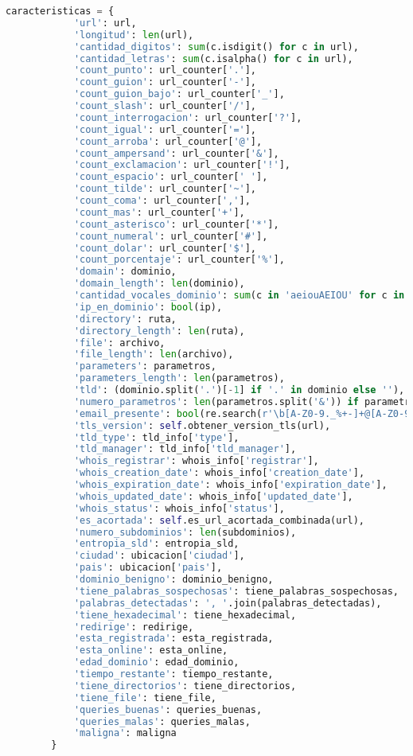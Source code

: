 \documentclass{article}
\begin{document}
\begin{lstlisting}[language=Python, caption=Clase para extraer características de URLs]
        caracteristicas = {
            'url': url,
            'longitud': len(url),
            'cantidad_digitos': sum(c.isdigit() for c in url),
            'cantidad_letras': sum(c.isalpha() for c in url),
            'count_punto': url_counter['.'],
            'count_guion': url_counter['-'],
            'count_guion_bajo': url_counter['_'],
            'count_slash': url_counter['/'],
            'count_interrogacion': url_counter['?'],
            'count_igual': url_counter['='],
            'count_arroba': url_counter['@'],
            'count_ampersand': url_counter['&'],
            'count_exclamacion': url_counter['!'],
            'count_espacio': url_counter[' '],
            'count_tilde': url_counter['~'],
            'count_coma': url_counter[','],
            'count_mas': url_counter['+'],
            'count_asterisco': url_counter['*'],
            'count_numeral': url_counter['#'],
            'count_dolar': url_counter['$'],
            'count_porcentaje': url_counter['%'],
            'domain': dominio,
            'domain_length': len(dominio),
            'cantidad_vocales_dominio': sum(c in 'aeiouAEIOU' for c in dominio),
            'ip_en_dominio': bool(ip),
            'directory': ruta,
            'directory_length': len(ruta),
            'file': archivo,
            'file_length': len(archivo),
            'parameters': parametros,
            'parameters_length': len(parametros),
            'tld': (dominio.split('.')[-1] if '.' in dominio else ''),
            'numero_parametros': len(parametros.split('&')) if parametros else 0,
            'email_presente': bool(re.search(r'\b[A-Z0-9._%+-]+@[A-Z0-9.-]+\.[A-Z]{2,}\b', url, re.I)),
            'tls_version': self.obtener_version_tls(url),
            'tld_type': tld_info['type'],
            'tld_manager': tld_info['tld_manager'],
            'whois_registrar': whois_info['registrar'],
            'whois_creation_date': whois_info['creation_date'],
            'whois_expiration_date': whois_info['expiration_date'],
            'whois_updated_date': whois_info['updated_date'],
            'whois_status': whois_info['status'],
            'es_acortada': self.es_url_acortada_combinada(url),
            'numero_subdominios': len(subdominios),
            'entropia_sld': entropia_sld,
            'ciudad': ubicacion['ciudad'],
            'pais': ubicacion['pais'],
            'dominio_benigno': dominio_benigno,
            'tiene_palabras_sospechosas': tiene_palabras_sospechosas,
            'palabras_detectadas': ', '.join(palabras_detectadas),
            'tiene_hexadecimal': tiene_hexadecimal,
            'redirige': redirige,
            'esta_registrada': esta_registrada,
            'esta_online': esta_online,
            'edad_dominio': edad_dominio,
            'tiempo_restante': tiempo_restante,
            'tiene_directorios': tiene_directorios,
            'tiene_file': tiene_file,
            'queries_buenas': queries_buenas,
            'queries_malas': queries_malas,
            'maligna': maligna
        }


\end{lstlisting}
\end{document}

